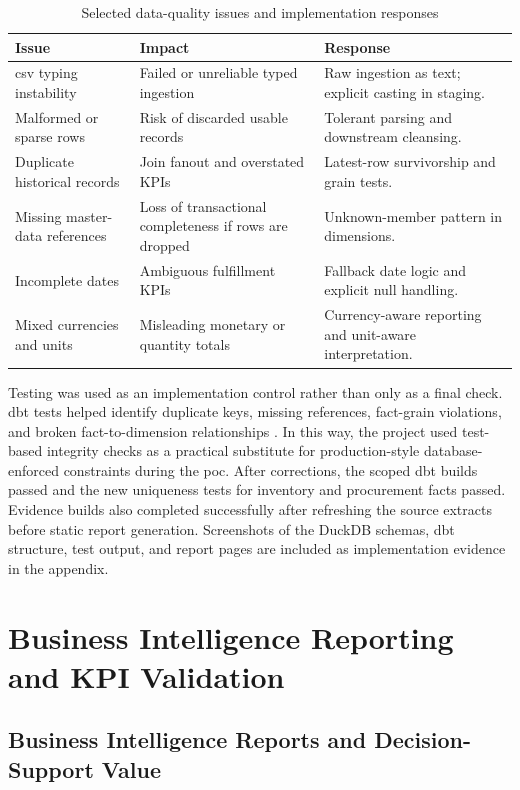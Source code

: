 \begin{table}[htbp]
\centering
\small
\caption{Selected data-quality issues and implementation responses}
\label{tab:data-quality-condensed}
\begin{tabular}{p{} p{} p{}}
\hline
\textbf{Issue} & \textbf{Impact} & \textbf{Response} \\
\hline
\ac{csv} typing instability & Failed or unreliable typed ingestion & Raw ingestion as text; explicit casting in staging. \\
Malformed or sparse rows & Risk of discarded usable records & Tolerant parsing and downstream cleansing. \\
Duplicate historical records & Join fanout and overstated KPIs & Latest-row survivorship and grain tests. \\
Missing master-data references & Loss of transactional completeness if rows are dropped & Unknown-member pattern in dimensions. \\
Incomplete dates & Ambiguous fulfillment KPIs & Fallback date logic and explicit null handling. \\
Mixed currencies and units & Misleading monetary or quantity totals & Currency-aware reporting and unit-aware interpretation. \\
\hline
\end{tabular}
\normalsize
\end{table}

Testing was used as an implementation control rather than only as a final check. \ac{dbt} tests helped identify duplicate keys, missing references, fact-grain violations, and broken fact-to-dimension relationships \parencite{wang_beyond_1996}. In this way, the project used test-based integrity checks as a practical substitute for production-style database-enforced constraints during the \ac{poc}. After corrections, the scoped \ac{dbt} builds passed and the new uniqueness tests for inventory and procurement facts passed. Evidence builds also completed successfully after refreshing the source extracts before static report generation. Screenshots of the DuckDB schemas, \ac{dbt} structure, test output, and report pages are included as implementation evidence in the appendix.

\section{Business Intelligence Reporting and KPI Validation}

\subsection{Business Intelligence Reports and Decision-Support Value}

